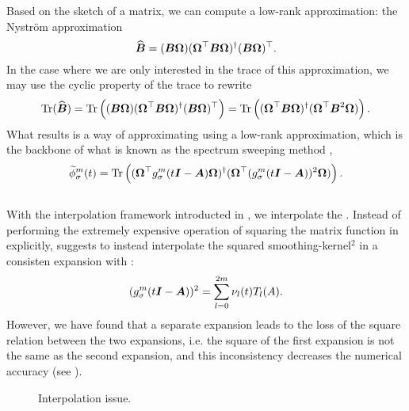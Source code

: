 Based on the sketch of a matrix, we can compute a low-rank approximation:
the Nyström approximation \cite{gittens2013nystrom,lin2017randomized}
\begin{equation}
    \widehat{\boldsymbol{B}} = (\boldsymbol{B} \boldsymbol{\Omega}) (\boldsymbol{\Omega}^{\top} \boldsymbol{B} \boldsymbol{\Omega})^{\dagger} (\boldsymbol{B} \boldsymbol{\Omega})^{\top}.
    \label{equ:3-nystrom-nystrom}
\end{equation}
In the case where we are only interested in the trace of this approximation,
we may use the cyclic property of the trace to rewrite
\begin{equation}
    \operatorname{Tr}(\widehat{\boldsymbol{B}})
        = \operatorname{Tr}\left((\boldsymbol{B} \boldsymbol{\Omega}) (\boldsymbol{\Omega}^{\top} \boldsymbol{B} \boldsymbol{\Omega})^{\dagger} (\boldsymbol{B} \boldsymbol{\Omega})^{\top} \right)
        = \operatorname{Tr}\left((\boldsymbol{\Omega}^{\top} \boldsymbol{B} \boldsymbol{\Omega})^{\dagger} (\boldsymbol{\Omega}^{\top} \boldsymbol{B}^2 \boldsymbol{\Omega}) \right).
    \label{equ:3-nystrom-nystrom-trace}
\end{equation}
What results is a way of approximating 
using a low-rank approximation, which is the backbone of what is known
as the spectrum sweeping method \cite{lin2017randomized},
\begin{equation}
    \widetilde{\phi}_{\sigma}^m(t)
        = \operatorname{Tr}\left((\boldsymbol{\Omega}^{\top} g_{\sigma}^m(t\boldsymbol{I} - \boldsymbol{A}) \boldsymbol{\Omega})^{\dagger} (\boldsymbol{\Omega}^{\top} (g_{\sigma}^m(t\boldsymbol{I} - \boldsymbol{A}))^2 \boldsymbol{\Omega})\right).
    \label{equ:3-nystrom-spectral-density}
\end{equation}\\

With the interpolation framework introducted in ,
we interpolate the . Instead of performing the extremely
expensive operation of squaring the matrix function in 
explicitly, \cite{lin2017randomized} suggests to instead interpolate the
squared \gls{smoothing-kernel}$^2$ in a consisten expansion with
:
\begin{equation}
    (g_{\sigma}^m(t\boldsymbol{I} - \boldsymbol{A}))^2 = \sum_{l=0}^{2m} \nu_l(t) T_l(A).
    \label{equ:3-nystrom-ESS-chebyshev-expansion}
\end{equation}
However, we have found that a separate expansion leads to the loss of the
square relation between the two expansions, i.e. the square of the
first expansion is not the same as the second expansion, and this inconsistency
decreases the numerical accuracy (see ).\\
\begin{figure}[ht]
    \centering
    
    \caption{Interpolation issue.}
    \label{fig:3-nystrom-interpolation-issue}
\end{figure}

